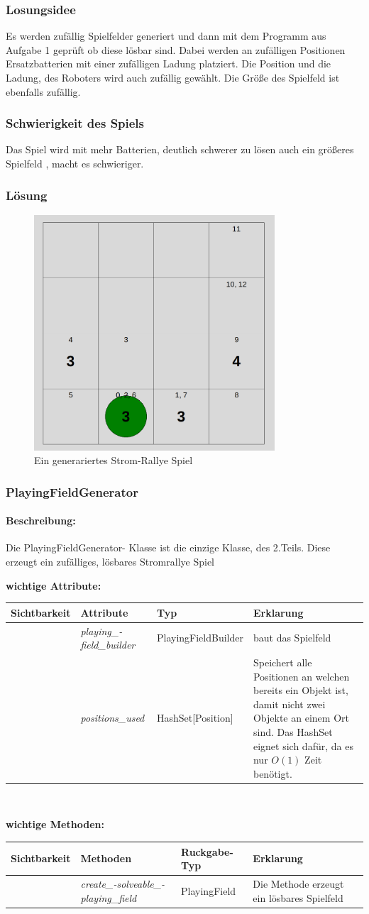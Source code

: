 \documentclass[a4paper,12pt,arial]{scrartcl}
\newenvironment{classInformation}[1]
{
    \subsubsection{#1}
    \label{sec:#1}
}
{
}
\newcommand{\addDescription}[1]{
\paragraph{Beschreibung:}
#1
}
\newenvironment{classAttributes}{
    \textbf{wichtige Attribute:}
    \\
    \begin{table}[h!]
    \begin{tabular}{| p{0.15\textwidth} |p{0.15\textwidth} | p{0.15\textwidth} | p{0.5\textwidth}|}
    \hline
    Sichtbarkeit & Attribute & Typ & Erklarung \\ [0.5ex]
    \hline\hline
    }
    {
    \hline
    \end{tabular}
    \end{table}
    \\
    }
\newcommand{\addAttribute}[4]{\centering{\textbf{#1}} & \textit{#2} & #3 &  #4 \\}
\newenvironment{classMethods}
{
\textbf{wichtige Methoden:}
\\
\begin{table}[h!]
\begin{tabular}{| p{0.15\textwidth} | p{0.17\textwidth} | p{0.18\textwidth} | p{0.5\textwidth}|}
\hline
Sichtbarkeit & Methoden & Ruckgabe-Typ & Erklarung \\ [0.5ex]
\hline\hline
}
{
\hline
\end{tabular}
\end{table}
\\
}
\newcommand{\addMethod}[4]{\centering{\textbf{#1}} & \textit{#2} & #3 &  #4 \\}
\begin{document}
\subsubsection{Losungsidee}
Es werden zufällig Spielfelder generiert und dann mit dem Programm aus Aufgabe 1 geprüft ob diese lösbar sind. Dabei werden an zufälligen Positionen Ersatzbatterien mit einer zufälligen Ladung platziert. Die Position und die Ladung, des Roboters wird auch zufällig gewählt.
Die Größe des Spielfeld ist ebenfalls zufällig.
\subsubsection{Schwierigkeit des Spiels}
Das Spiel wird mit mehr Batterien, deutlich schwerer zu lösen auch ein größeres Spielfeld , macht es schwieriger.
\subsubsection{Lösung}
\begin{figure}[h]
    \centering
    \includegraphics[width=0.8\textwidth]{aufgabe1_2_solution.png}
    \caption{Ein generariertes Strom-Rallye Spiel}
    \label{fig:loesung1}
\end{figure}
\newpage
\begin{classInformation}{PlayingFieldGenerator}
\addDescription{Die PlayingFieldGenerator- Klasse ist die einzige Klasse, des 2.Teils. Diese erzeugt ein zufälliges, lösbares Stromrallye Spiel}
\begin{classAttributes}
\addAttribute{-}{playing\_-field\_builder}{PlayingFieldBuilder}{baut das Spielfeld}
\addAttribute{-}{positions\_used}{HashSet[Position]}{Speichert alle Positionen an welchen bereits ein Objekt ist, damit nicht zwei Objekte an einem Ort sind. Das HashSet eignet sich dafür, da es nur $O(1)$ Zeit benötigt.}
\end{classAttributes}

\begin{classMethods}
\addMethod{+}{create\_-solveable\_-playing\_field}{PlayingField}{Die Methode erzeugt ein lösbares Spielfeld}
\end{classMethods}

\end{classInformation}
\end{document}
